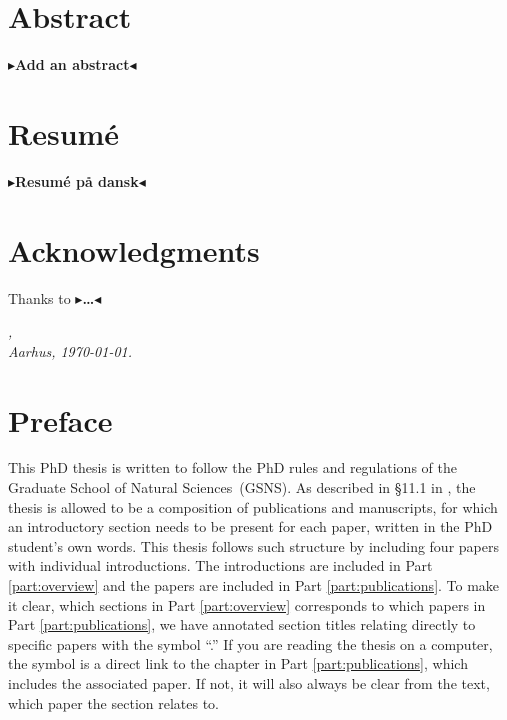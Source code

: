 \documentclass[11pt,a4paper,twoside,openright,final]{memoir}
\makeatletter
\def\ifdraft{\ifdim\overfullrule>\z@
  \expandafter\@firstoftwo\else\expandafter\@secondoftwo\fi}
\newcommand{\todo}[1]{{
    \ifdraft{
        \color[rgb]{.5,0,0}\textbf{
            $\blacktriangleright$#1$\blacktriangleleft$
         }
    }{}}}
\newcommand\contribution[1]{\hspace{0.5em}\hyperref[#1]{\ding{81}}}
\makeatother
\begin{document}
\frontmatter
\cleardoublepage
\chapter*{{\Huge Abstract}}
\todo{Add an abstract}

\cleardoublepage
\chapter*{{\Huge Resum\'e}}

\todo{Resum\'e på dansk}

\cleardoublepage
\chapter*{{\Huge Acknowledgments}}

Thanks to \todo{\dots}

\vspace{2ex}
\begin{flushright}
  \makeatletter\emph{\theauthor,}\makeatother\\
  \emph{Aarhus, \today.}
\end{flushright}

\cleardoublepage
\chapter*{{\Huge Preface}}
This PhD thesis is written to follow the PhD rules and regulations of the Graduate School of Natural Sciences~(GSNS)\cite{au-regulations}. 
As described in \S 11.1 in \cite{au-regulations}, the thesis is allowed to be a composition of publications and manuscripts, for which an introductory section needs to be present for each paper, written in the PhD student's own words.
This thesis follows such structure by including four papers with individual introductions.
The introductions are included in Part \ref{part:overview} and the papers are included in Part \ref{part:publications}.
To make it clear, which sections in Part \ref{part:overview} corresponds to which papers in Part \ref{part:publications}, we have annotated section titles relating directly to specific papers with the symbol  ``\hspace{-0.5em}\contribution{pap:svd}.''
If you are reading the thesis on a computer, the symbol is a direct link to the chapter in Part \ref{part:publications}, which includes the associated paper.
If not, it will also always be clear from the text, which paper the section relates to.
\end{document}
